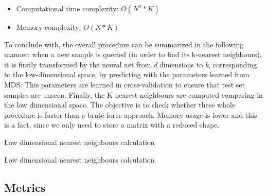 \documentclass[a4paper,11pt,spanish]{report}
\makeatletter
\def\BState{\State\hskip-\ALG@thistlm}
\makeatother
\begin{document}
\begin{itemize}
\item Computational time complexity: $O(N^{2}*K)$
\item Memory complexity: $O(N*K)$
\end{itemize}

To conclude with, the overall procedure can be summarized in the following manner: when a new sample is queried (in order to find its k-nearest neighbours), it is firstly transformed by the neural net from \textit{d} dimensions to \textit{k}, corresponding to the low-dimensional space, by predicting with the parameters learned from MDS. This parameters are learned in cross-validation to ensure that test set samples are unseen. Finally, the K nearest neighbours are computed comparing in the low  dimensional space. The objective is to check whether these whole procedure is faster than a brute force approach. Memory usage is lower and this is a fact, since we only need to store a matrix with a reduced shape.

\begin{algorithm}
\caption{Low dimensional nearest neighbours calculation}
\end{algorithm}
\hfill

\begin{algorithm}
\caption{Low dimensional nearest neighbours calculation}
\end{algorithm}

\subsection{Metrics}
\label{ssec:met2}
\end{document}

